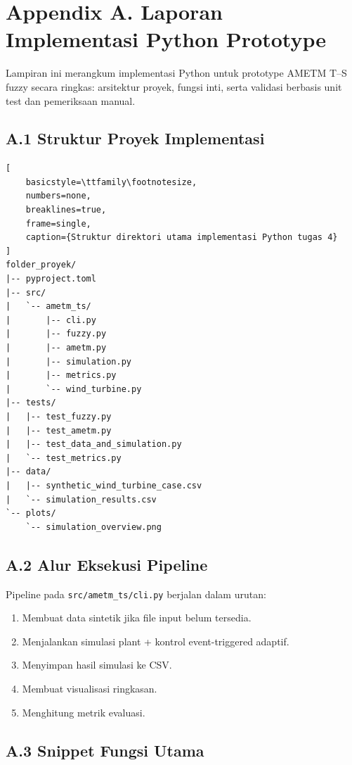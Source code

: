 \section*{Appendix A. Laporan Implementasi Python Prototype}

Lampiran ini merangkum implementasi Python untuk prototype AMETM T--S fuzzy secara ringkas: arsitektur proyek, fungsi inti, serta validasi berbasis unit test dan pemeriksaan manual.

\subsection*{A.1 Struktur Proyek Implementasi}

\begin{lstlisting}[
    basicstyle=\ttfamily\footnotesize,
    numbers=none,
    breaklines=true,
    frame=single,
    caption={Struktur direktori utama implementasi Python tugas 4}
]
folder_proyek/
|-- pyproject.toml
|-- src/
|   `-- ametm_ts/
|       |-- cli.py
|       |-- fuzzy.py
|       |-- ametm.py
|       |-- simulation.py
|       |-- metrics.py
|       `-- wind_turbine.py
|-- tests/
|   |-- test_fuzzy.py
|   |-- test_ametm.py
|   |-- test_data_and_simulation.py
|   `-- test_metrics.py
|-- data/
|   |-- synthetic_wind_turbine_case.csv
|   `-- simulation_results.csv
`-- plots/
    `-- simulation_overview.png
\end{lstlisting}

\subsection*{A.2 Alur Eksekusi Pipeline}

Pipeline pada \texttt{src/ametm\_ts/cli.py} berjalan dalam urutan:
\begin{enumerate}
    \item Membuat data sintetik jika file input belum tersedia.
    \item Menjalankan simulasi plant + kontrol event-triggered adaptif.
    \item Menyimpan hasil simulasi ke CSV.
    \item Membuat visualisasi ringkasan.
    \item Menghitung metrik evaluasi.
\end{enumerate}

\subsection*{A.3 Snippet Fungsi Utama}

